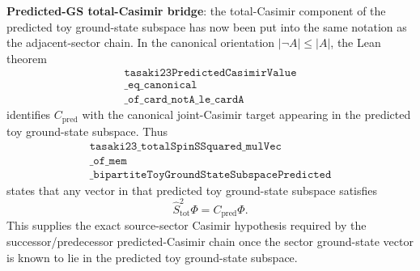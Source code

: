 \documentclass[a4paper,11pt]{article}
\begin{document}
\textbf{Predicted-GS total-Casimir bridge}: the total-Casimir component
of the predicted toy ground-state subspace has now been put into the
same notation as the adjacent-sector chain.  In the canonical
orientation \(|\neg A|\le |A|\), the Lean theorem
\[
\begin{gathered}
\texttt{tasaki23PredictedCasimirValue}\\
\texttt{\_eq\_canonical}\\
\texttt{\_of\_card\_notA\_le\_cardA}
\end{gathered}
\]
identifies \(C_{\mathrm{pred}}\) with the canonical joint-Casimir target
appearing in the predicted toy ground-state subspace.  Thus
\[
\begin{gathered}
\texttt{tasaki23\_totalSpinSSquared\_mulVec}\\
\texttt{\_of\_mem}\\
\texttt{\_bipartiteToyGroundStateSubspacePredicted}
\end{gathered}
\]
states that any vector in that predicted toy ground-state subspace
satisfies
\[
  \hat S_{\mathrm{tot}}^2\Phi
    =
  C_{\mathrm{pred}}\Phi .
\]
This supplies the exact source-sector Casimir hypothesis required by
the successor/predecessor predicted-Casimir chain once the sector
ground-state vector is known to lie in the predicted toy ground-state
subspace.
\end{document}
